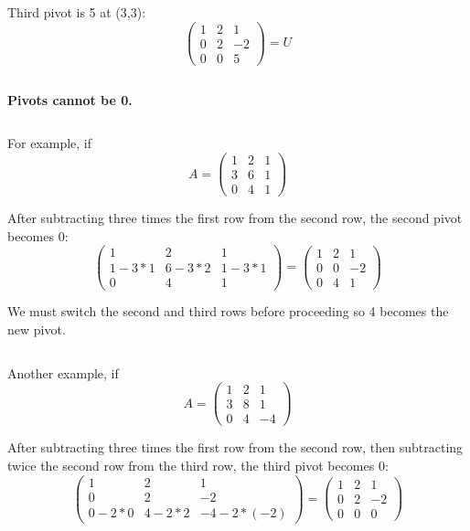 \documentclass[12pt]{article}
\begin{document}
Third pivot is 5 at (3,3):
\[
\left(
    \begin{matrix}
        1 & 2 & 1\\ 
        0 & 2 & -2\\
        0 & 0 & \boxed{5}
    \end{matrix}
\right)
=U
\]

$\>$

\textbf{Pivots cannot be 0.} 

$\>$

For example, if
\[
A=
\left(
    \begin{matrix}
        1 & 2 & 1\\ 
        3 & 6 & 1\\
        0 & 4 & 1
    \end{matrix}
\right)
\]

After subtracting three times the first row from the second row, the second pivot becomes 0:
\[
\left(
    \begin{matrix}
        1 & 2 & 1\\ 
        1-3*1 & 6-3*2 & 1-3*1\\
        0 & 4 & 1
    \end{matrix}
\right)
=
\left(
    \begin{matrix}
        1 & 2 & 1\\ 
        0 & \boxed{0} & -2\\
        0 & 4 & 1
    \end{matrix}
\right)
\]

We must switch the second and third rows before proceeding so 4 becomes the new pivot.

$\>$

Another example, if
\[
A=
\left(
    \begin{matrix}
        1 & 2 & 1\\ 
        3 & 8 & 1\\
        0 & 4 & -4
    \end{matrix}
\right)
\]

After subtracting three times the first row from the second row, then subtracting twice the second row from the third row, the third pivot becomes 0:
\[
\left(
    \begin{matrix}
        1 & 2 & 1\\ 
        0 & 2 & -2\\
        0-2*0 & 4-2*2 & -4-2*(-2)
    \end{matrix}
\right)
=
\left(
    \begin{matrix}
        1 & 2 & 1\\ 
        0 & 2 & -2\\
        0 & 0 & \boxed{0}
    \end{matrix}
\right)
\]
\end{document}
